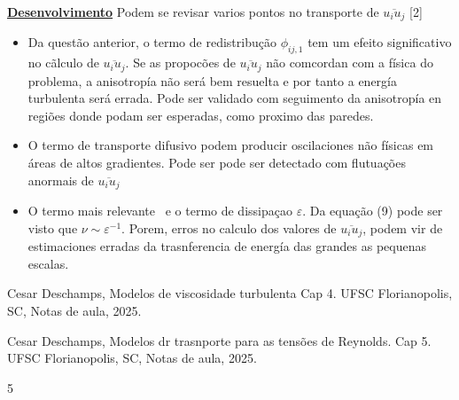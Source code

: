 \documentclass[12pt]{article}
\begin{document}
\textbf{\underline{Desenvolvimento}}
Podem se revisar varios pontos no transporte de $\overline{u_i u_j}$ [2]

\begin{itemize}
	\item Da questão anterior, o termo de redistribução $\phi_{ij,1}$ tem um efeito significativo no cãlculo de $\overline{u_i u_j}$. Se as propocões de $\overline{u_i u_j}$ não comcordan com a física do problema, a anisotropía não será bem resuelta e por tanto a energía turbulenta será errada. Pode ser validado com seguimento da anisotropía en regiões donde podam ser esperadas, como proximo das paredes.
	\item O termo de transporte difusivo podem producir oscilaciones não físicas em áreas de altos gradientes. Pode ser pode ser detectado com flutuações anormais de $\overline{u_i u_j}$
	\item O termo mais relevante ~e o termo de dissipaçao $\varepsilon$. Da equação (9) pode ser visto que $\nu \sim \varepsilon^{-1}$. Porem, erros no calculo dos valores de $\overline{u_i u_j}$, podem vir de estimaciones erradas da trasnferencia de energía das grandes as pequenas escalas.  
\end{itemize}


\begin{thebibliography}{999}
	
	
	Cesar Deschamps,
	Modelos de viscosidade turbulenta Cap 4.
	UFSC Florianopolis, SC,
	Notas de aula,
	2025.
	
	Cesar Deschamps,
	Modelos dr trasnporte para as tensões de Reynolds. Cap 5.
	UFSC Florianopolis, SC,
	Notas de aula,
	2025.
		
	
\end{thebibliography}
5
\end{document}
